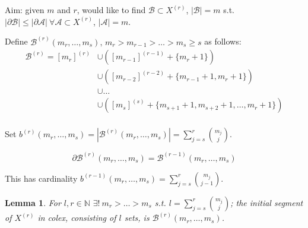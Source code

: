 \documentclass[a4paper]{article}
\newtheorem{lemma}[theorem]{Lemma}
\newcommand*\abs[1]{\left|#1\right|}
\begin{document}
Aim: given $m$ and $r$, would like to find $\mathcal{B} \subset X^{(r)}$, $\abs{\mathcal{B}} = m$ s.t. $\abs{\partial\mathcal{B}} \leq \abs{\partial\mathcal{A}}\ \forall \mathcal{A} \subset X^{(r)}$, $\abs{\mathcal{A}} = m$.

Define $\mathcal{B}^{(r)}(m_r, \dots, m_s),\, m_r > m_{r-1} > \dots > m_s \geq s$ as follows:
\begin{align*}
\mathcal{B}^{(r)} = [m_r]^{(r)} &\cup ([m_{r-1}]^{(r-1)} + \{m_{r} + 1\}) \\
								&\cup ([m_{r-2}]^{(r-2)} + \{m_{r-1} +1, m_r + 1\}) \\
								&\cup \dots \\
								&\cup ([m_{s}]^{(s)} + \{m_{s+1} +1, m_{s+2} + 1, \dots, m_r + 1\}) \\
\end{align*}

Set $b^{(r)}(m_r, \dots, m_s) = \abs{\mathcal{B}^{(r)}(m_r, \dots, m_s)} = \sum_{j=s}^r {m_j \choose j}$.

$$\partial\mathcal{B}^{(r)}(m_r, \dots, m_s) = \mathcal{B}^{(r-1)}(m_r, \dots, m_s)$$

This has cardinality $b^{(r-1)}(m_r, \dots, m_s) = \sum_{j=s}^r {m_j \choose j-1}$.

\begin{lemma}
	For $l, r \in \mathbb{N}$ $\exists!\ m_r > \dots > m_s$  s.t. $l = \sum_{j=s}^r {m_j \choose j}$; the initial segment of $X^{(r)}$ in colex, consisting of $l$ sets, is $\mathcal{B}^{(r)}(m_r, \dots, m_s)$.
\end{lemma}
\end{document}
